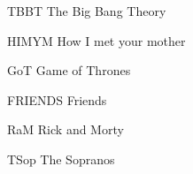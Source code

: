 \begin{acronyms}
\item[TBBT] The Big Bang Theory  
\item[HIMYM]  How I met your mother
\item[GoT] Game of Thrones
\item[FRIENDS] Friends
\item[RaM] Rick and Morty
\item[TSop] The Sopranos
\end{acronyms}